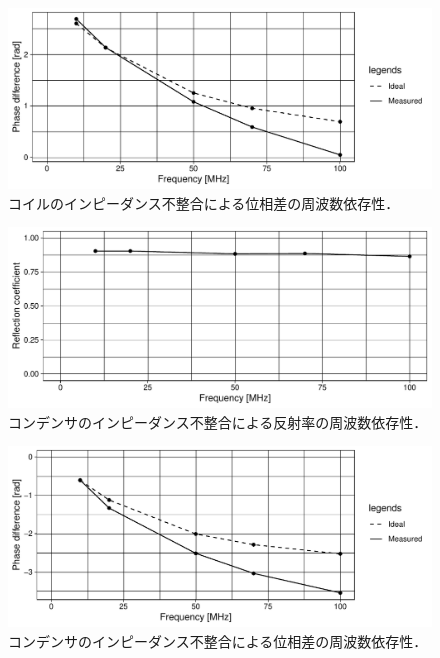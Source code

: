 \documentclass[uplatex,dvipdfmx,a4j,12pt]{jsarticle}
\begin{document}
\begin{figure}[H]
  \centering
  \includegraphics[width=\linewidth]{data/2_1/phase_diff.pdf}
  \caption{コイルのインピーダンス不整合による位相差の周波数依存性．}
  \label{fig:2-2}
\end{figure}

\begin{figure}[H]
  \centering
  \includegraphics[width=\linewidth]{data/2_2/reflection_vs_freq.pdf}
  \caption{コンデンサのインピーダンス不整合による反射率の周波数依存性．}
  \label{fig:2-3}
\end{figure}

\begin{figure}[H]
\centering
\includegraphics[width=\linewidth]{data/2_2/phase_diff.pdf}
\caption{コンデンサのインピーダンス不整合による位相差の周波数依存性．}
\label{fig:2-4}
\end{figure}
\end{document}
